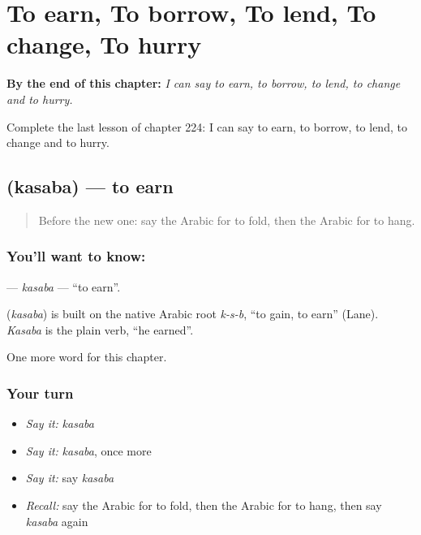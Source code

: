 
\chapter{To earn, To borrow, To lend, To change, To hurry}
\label{ch:ar-to-earn-to-borrow-to-lend-to-change-to-hurry}

\begin{chapteropening}
\textbf{By the end of this chapter:} \emph{I can say to earn, to borrow, to lend, to change and to hurry.}

Complete the last lesson of chapter 224: I can say to earn, to borrow, to lend, to change and to hurry.
\end{chapteropening}

\section[\texorpdfstring{\ar{كسب} (kasaba)}{كسب (kasaba)}]{ (kasaba) — to earn}

\label{lesson:AR-C224-kasaba}



\begin{quote}
Before the new one: say the Arabic for to fold, then the Arabic for to hang.
\end{quote}

\subsection*{You'll want to know: }
\textbf{} — \emph{kasaba} — \textquotedblleft{}to earn\textquotedblright{}.

\begin{cousinweb}
\textbf{} (\emph{kasaba}) is built on the native Arabic root \emph{k-s-b}, \textquotedblleft{}to gain, to earn\textquotedblright{} (Lane). \emph{Kasaba} is the plain verb, \textquotedblleft{}he earned\textquotedblright{}.
\end{cousinweb}

\begin{grammarlens}[title={What you've built}]
One more word for this chapter.
\end{grammarlens}

\subsection*{Your turn}
\begin{itemize}
\raggedright
  \item \emph{Say it:} \emph{kasaba}
  \item \emph{Say it:} \emph{kasaba}, once more
  \item \emph{Say it:} say \emph{kasaba}
  \item \emph{Recall:} say the Arabic for to fold, then the Arabic for to hang, then say \emph{kasaba} again
\end{itemize}


